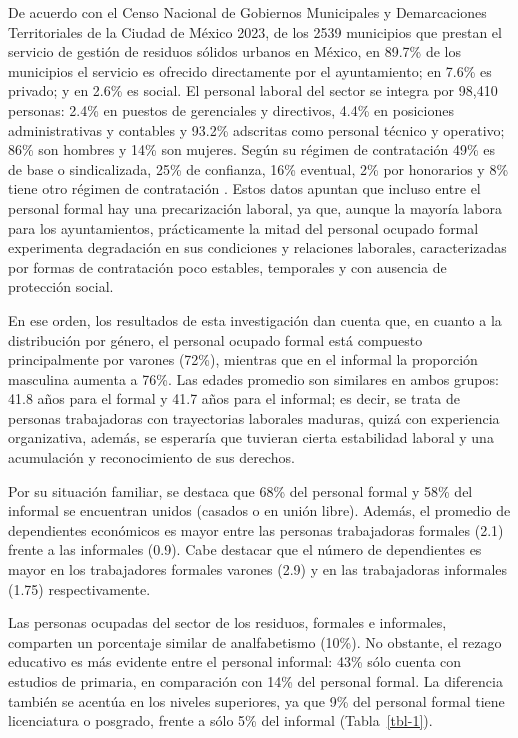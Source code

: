 \documentclass[
  spanish,
  11pt,
  a4paper,
]{scrbook}
\begin{document}
De acuerdo con el Censo Nacional de Gobiernos Municipales y
Demarcaciones Territoriales de la Ciudad de México 2023, de los 2539
municipios que prestan el servicio de gestión de residuos sólidos
urbanos en México, en 89.7\% de los municipios el servicio es ofrecido
directamente por el ayuntamiento; en 7.6\% es privado; y en 2.6\% es
social. El personal laboral del sector se integra por 98,410 personas:
2.4\% en puestos de gerenciales y directivos, 4.4\% en posiciones
administrativas y contables y 93.2\% adscritas como personal técnico y
operativo; 86\% son hombres y 14\% son mujeres. Según su régimen de
contratación 49\% es de base o sindicalizada, 25\% de confianza, 16\%
eventual, 2\% por honorarios y 8\% tiene otro régimen de contratación
\autocite{INEGI2023}. Estos datos apuntan que incluso entre el personal
formal hay una precarización laboral, ya que, aunque la mayoría labora
para los ayuntamientos, prácticamente la mitad del personal ocupado
formal experimenta degradación en sus condiciones y relaciones
laborales, caracterizadas por formas de contratación poco estables,
temporales y con ausencia de protección social.

En ese orden, los resultados de esta investigación dan cuenta que, en
cuanto a la distribución por género, el personal ocupado formal está
compuesto principalmente por varones (72\%), mientras que en el informal
la proporción masculina aumenta a 76\%. Las edades promedio son
similares en ambos grupos: 41.8 años para el formal y 41.7 años para el
informal; es decir, se trata de personas trabajadoras con trayectorias
laborales maduras, quizá con experiencia organizativa, además, se
esperaría que tuvieran cierta estabilidad laboral y una acumulación y
reconocimiento de sus derechos.

Por su situación familiar, se destaca que 68\% del personal formal y
58\% del informal se encuentran unidos (casados o en unión libre).
Además, el promedio de dependientes económicos es mayor entre las
personas trabajadoras formales (2.1) frente a las informales (0.9). Cabe
destacar que el número de dependientes es mayor en los trabajadores
formales varones (2.9) y en las trabajadoras informales (1.75)
respectivamente.

Las personas ocupadas del sector de los residuos, formales e informales,
comparten un porcentaje similar de analfabetismo (10\%). No obstante, el
rezago educativo es más evidente entre el personal informal: 43\% sólo
cuenta con estudios de primaria, en comparación con 14\% del personal
formal. La diferencia también se acentúa en los niveles superiores, ya
que 9\% del personal formal tiene licenciatura o posgrado, frente a sólo
5\% del informal (Tabla~\ref{tbl-1}).
\end{document}
